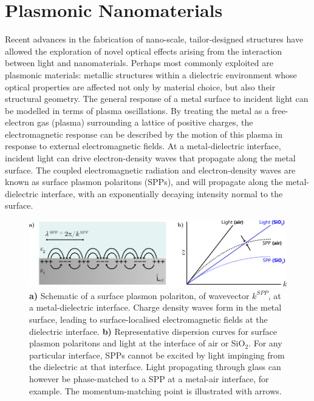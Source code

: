 \chapter{Plasmonic Nanomaterials}\label{sec:background:Plasmonics}
Recent advances in the fabrication of nano-scale, tailor-designed structures have allowed the exploration of novel optical effects arising from the interaction between light and nanomaterials. Perhaps most commonly exploited are plasmonic materials: metallic structures within a dielectric environment whose optical properties are affected not only by material choice, but also their structural geometry. 
The general response of a metal surface to incident light can be modelled in terms of plasma oscillations. By treating the metal as a free-electron gas (plasma) surrounding a lattice of positive charges, the electromagnetic response can be described by the motion of this plasma in response to external electromagnetic fields. 
At a metal-dielectric interface, incident light can drive electron-density waves that propagate along the metal surface. The coupled electromagnetic radiation and electron-density waves are known as surface plasmon polaritons (SPPs), and will propagate along the metal-dielectric interface, with an exponentially decaying intensity normal to the surface. 

\begin{figure}[htb!]
    \centering
    \includegraphics[scale=1.0]{./figures/background/plasmonics/spp.pdf}
    \caption{\label{fig:background:Plasmonics:SPP} \textbf{a)} Schematic of a surface plasmon polariton, of wavevector $k^{SPP}$, at a metal-dielectric interface. Charge density waves form in the metal surface, leading to surface-localised electromagnetic fields at the dielectric interface. \textbf{b)} Representative dispersion curves for surface plasmon polaritons and light at the interface of air or SiO$_2$. For any particular interface, SPPs cannot be excited by light impinging from the dielectric at that interface. Light propagating through glass can however be phase-matched to a SPP at a metal-air interface, for example. The momentum-matching point is illustrated with arrows. }
\end{figure}

